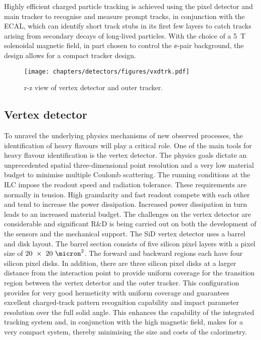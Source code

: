 Highly efficient charged particle tracking is achieved using the pixel detector
and main tracker to recognise and measure prompt tracks, in conjunction with the ECAL, which can
identify short track stubs in its first few layers 
to catch tracks arising from secondary decays of long-lived particles. With
the choice of a 5~T solenoidal magnetic field, in part chosen to control the $\ee$-pair
background, the design allows for a compact tracker design. 

\begin{figure}[tb]
 \begin{center}
 \texttt{[image: chapters/detectors/figures/vxdtrk.pdf]}
 \end{center}
\caption{r-z view of vertex detector and outer tracker.
\label{fig:fig_vxdtrk}}
  \end{figure}

\subsection{Vertex detector}

To unravel the underlying physics mechanisms of new observed processes, the
identification of heavy flavours will play a critical role. One of the main
tools for heavy flavour identification is the vertex detector. The physics goals
dictate an unprecedented spatial three-dimensional point resolution and a very
low material budget to minimise multiple Coulomb scattering. The running 
conditions at the ILC impose the readout speed and radiation tolerance. 
These requirements are normally in tension. High
granularity and fast readout compete with each other and tend to increase the
power dissipation. Increased power dissipation in turn leads to an increased
material budget. The challenges on the vertex detector are considerable and
significant R\&D is being carried out on both the development of the sensors and
the mechanical support.
The SiD vertex detector uses a barrel and disk layout. The barrel section
consists of five silicon pixel layers with a pixel size of
$20~\times~20~\micron^2$. The forward and backward regions each have four
silicon pixel disks. In addition, there are three silicon pixel disks at a
larger distance from the interaction point to provide uniform coverage for the
transition region between the vertex detector and the outer tracker. This
configuration provides for very good hermeticity with uniform coverage and
guarantees excellent charged-track pattern recognition capability
 and impact parameter resolution 
over the full solid angle. 
This enhances the capability of the integrated tracking system and, 
in conjunction with the high magnetic field, makes for a very compact
system, thereby minimising the size and costs of the calorimetry.

